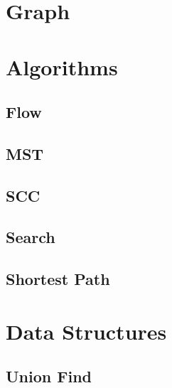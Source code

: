 %

\tableofcontents

\chapter{Graph}


\chapter{Algorithms}
\section{Flow}

\section{MST}

\section{SCC}

\section{Search}

\section{Shortest Path}


\chapter{Data Structures}

\section{Union Find}


